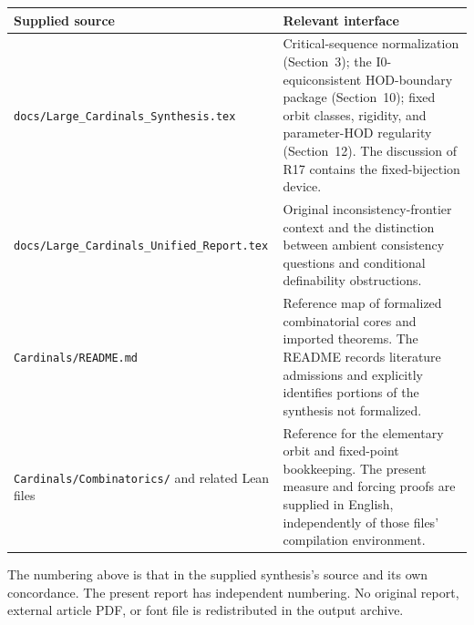 \documentclass[11pt,letterpaper]{article}
\theoremstyle{definition}
\newcommand{\Izero}{\mathrm I0}
\begin{document}
\begin{center}
\small
\renewcommand{\arraystretch}{1.15}
\begin{tabularx}{\textwidth}{@{}p{}X@{}}
\toprule
\textbf{Supplied source}&\textbf{Relevant interface}\\
\midrule
\nolinkurl{docs/Large_Cardinals_Synthesis.tex}&Critical-sequence normalization (Section~3); the $\Izero$-equiconsistent HOD-boundary package (Section~10); fixed orbit classes, rigidity, and parameter-HOD regularity (Section~12). The discussion of R17 contains the fixed-bijection device.\\
\nolinkurl{docs/Large_Cardinals_Unified_Report.tex}&Original inconsistency-frontier context and the distinction between ambient consistency questions and conditional definability obstructions.\\
\nolinkurl{Cardinals/README.md}&Reference map of formalized combinatorial cores and imported theorems. The README records literature admissions and explicitly identifies portions of the synthesis not formalized.\\
\nolinkurl{Cardinals/Combinatorics/} and related Lean files&Reference for the elementary orbit and fixed-point bookkeeping. The present measure and forcing proofs are supplied in English, independently of those files' compilation environment.\\
\bottomrule
\end{tabularx}
\end{center}

The numbering above is that in the supplied synthesis's source and its own concordance. The present report has independent numbering. No original report, external article PDF, or font file is redistributed in the output archive.
\end{document}
